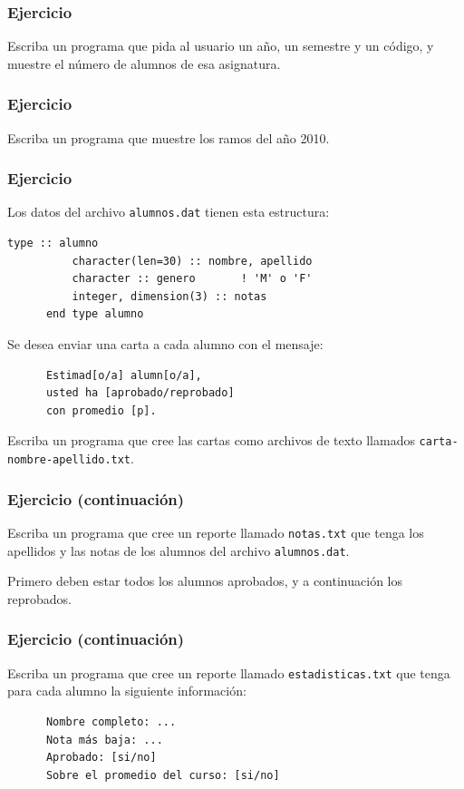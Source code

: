 \documentclass[12pt]{beamer}
\begin{document}
  \begin{frame}
    \frametitle{Ejercicio}
    Escriba un programa que pida al usuario
    un año, un semestre y un código,
    y muestre el número de alumnos de esa asignatura.
  \end{frame}

  \begin{frame}
    \frametitle{Ejercicio}
    Escriba un programa que muestre los ramos del año 2010.
  \end{frame}

  \begin{frame}[fragile]
    \frametitle{Ejercicio}
    \small
    Los datos del archivo \texttt{alumnos.dat} tienen esta estructura:
    \begin{lstlisting}[basicstyle=\small,gobble=6]
      type :: alumno
          character(len=30) :: nombre, apellido
          character :: genero       ! 'M' o 'F'
          integer, dimension(3) :: notas
      end type alumno
    \end{lstlisting}
    Se desea enviar una carta a cada alumno con el mensaje:
    \begin{Verbatim}
      Estimad[o/a] alumn[o/a],
      usted ha [aprobado/reprobado]
      con promedio [p].
    \end{Verbatim}
    Escriba un programa que cree las cartas
    como archivos de texto llamados \texttt{carta-nombre-apellido.txt}.

\end{frame}

  \begin{frame}
    \frametitle{Ejercicio (continuación)}
    \small
    Escriba un programa que cree un reporte llamado \texttt{notas.txt}
    que tenga los apellidos y las notas
    de los alumnos del archivo \texttt{alumnos.dat}.

    Primero deben estar todos los alumnos aprobados,
    y a continuación los reprobados.
  \end{frame}

  \begin{frame}[fragile]
    \frametitle{Ejercicio (continuación)}
    \small
    Escriba un programa que cree un reporte llamado \texttt{estadisticas.txt}
    que tenga para cada alumno la siguiente información:
    \begin{Verbatim}
      Nombre completo: ...
      Nota más baja: ...
      Aprobado: [si/no]
      Sobre el promedio del curso: [si/no]
    \end{Verbatim}

\end{frame}
\end{document}
